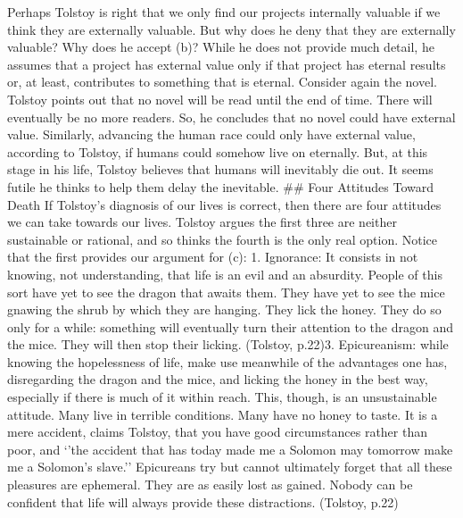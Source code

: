 \documentclass[]{article}
\begin{document}
Perhaps Tolstoy is right that we only find our projects internally
valuable if we think they are externally valuable. But why does he deny
that they are externally valuable? Why does he accept (b)? While he does
not provide much detail, he assumes that a project has external value
only if that project has eternal results or, at least, contributes to
something that is eternal. Consider again the novel. Tolstoy points out
that no novel will be read until the end of time. There will eventually
be no more readers. So, he concludes that no novel could have external
value. Similarly, advancing the human race could only have external
value, according to Tolstoy, if humans could somehow live on eternally.
But, at this stage in his life, Tolstoy believes that humans will
inevitably die out. It seems futile he thinks to help them delay the
inevitable. \#\# Four Attitudes Toward Death If Tolstoy's diagnosis of
our lives is correct, then there are four attitudes we can take towards
our lives. Tolstoy argues the first three are neither sustainable or
rational, and so thinks the fourth is the only real option. Notice that
the first provides our argument for (c): 1. Ignorance: It consists in
not knowing, not understanding, that life is an evil and an absurdity.
People of this sort have yet to see the dragon that awaits them. They
have yet to see the mice gnawing the shrub by which they are hanging.
They lick the honey. They do so only for a while: something will
eventually turn their attention to the dragon and the mice. They will
then stop their licking. (Tolstoy, p.22)3. Epicureanism: while knowing
the hopelessness of life, make use meanwhile of the advantages one has,
disregarding the dragon and the mice, and licking the honey in the best
way, especially if there is much of it within reach. This, though, is an
unsustainable attitude. Many live in terrible conditions. Many have no
honey to taste. It is a mere accident, claims Tolstoy, that you have
good circumstances rather than poor, and `'the accident that has today
made me a Solomon may tomorrow make me a Solomon's slave.'' Epicureans
try but cannot ultimately forget that all these pleasures are ephemeral.
They are as easily lost as gained. Nobody can be confident that life
will always provide these distractions. (Tolstoy, p.22)
\end{document}
